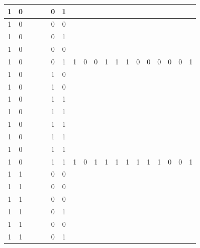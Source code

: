 \begin{table}[!tb]
\begin{tabular}{|c|c|c|c|c|c|c|c|c|c|c|c|c|c|c|c|c|c|c|}
        \rowcolor{yellow!40} 1 & 0 &  &  &  & 0 & 1 &  &  &  &  &  &  &  &  &  &  &  &  \\ \hline
        \rowcolor{yellow!40} 1 & 0 &  &  &  & 0 & 0 &  &  &  &  &  &  &  &  &  &  &  &  \\ \hline
        \rowcolor{yellow!40} 1 & 0 &  &  &  & 0 & 1 &  &  &  &  &  &  &  &  &  &  &  &  \\ \hline
        \rowcolor{yellow!40} 1 & 0 &  &  &  & 0 & 0 &  &  &  &  &  &  &  &  &  &  &  &  \\ \hline
        \rowcolor{yellow!40} 1 & 0 &  &  &  & 0 & 1 & 1 & 0 & 0 & 1 & 1 & 1 & 0 & 0 & 0 & 0 & 0 & 1 \\ \hline
        \rowcolor{gray!40} 1 & 0 &  &  &  & 1 & 0 &  &  &  &  &  &  &  &  &  &  &  &  \\ \hline
        \rowcolor{gray!40} 1 & 0 &  &  &  & 1 & 0 &  &  &  &  &  &  &  &  &  &  &  &  \\ \hline
        \rowcolor{gray!40} 1 & 0 &  &  &  & 1 & 1 &  &  &  &  &  &  &  &  &  &  &  &  \\ \hline
        \rowcolor{gray!40} 1 & 0 &  &  &  & 1 & 1 &  &  &  &  &  &  &  &  &  &  &  &  \\ \hline
        \rowcolor{gray!40} 1 & 0 &  &  &  & 1 & 1 &  &  &  &  &  &  &  &  &  &  &  &  \\ \hline
        \rowcolor{gray!40} 1 & 0 &  &  &  & 1 & 1 &  &  &  &  &  &  &  &  &  &  &  &  \\ \hline
        \rowcolor{gray!40} 1 & 0 &  &  &  & 1 & 1 &  &  &  &  &  &  &  &  &  &  &  &  \\ \hline
        \rowcolor{gray!40} 1 & 0 &  &  &  & 1 & 1 & 1 & 0 & 1 & 1 & 1 & 1 & 1 & 1 & 1 & 0 & 0 & 1 \\ \hline
        \rowcolor{blue!40} 1 & 1 &  &  &  & 0 & 0 &  &  &  &  &  &  &  &  &  &  &  &  \\ \hline
        \rowcolor{blue!40} 1 & 1 &  &  &  & 0 & 0 &  &  &  &  &  &  &  &  &  &  &  &  \\ \hline
        \rowcolor{blue!40} 1 & 1 &  &  &  & 0 & 0 &  &  &  &  &  &  &  &  &  &  &  &  \\ \hline
        \rowcolor{blue!40} 1 & 1 &  &  &  & 0 & 1 &  &  &  &  &  &  &  &  &  &  &  &  \\ \hline
        \rowcolor{blue!40} 1 & 1 &  &  &  & 0 & 0 &  &  &  &  &  &  &  &  &  &  &  &  \\ \hline
        \rowcolor{blue!40} 1 & 1 &  &  &  & 0 & 1 &  &  &  &  &  &  &  &  &  &  &  &  \\ \hline

\end{tabular}
\end{table}
